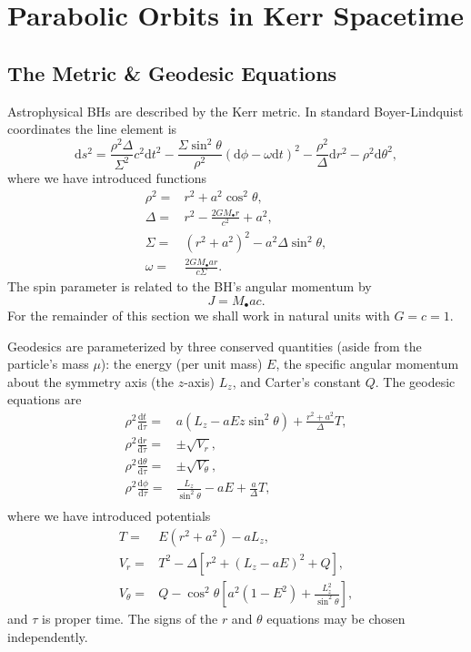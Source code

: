 \documentclass[a4paper, 11pt, titlepage, twoside]{report}
\newcommand{\dd}{\ensuremath{\mathrm{d}}}
\newcommand{\diff}[2]{\ensuremath{\frac{\dd {#1}}{\dd {#2}}}}
\begin{document}
\section{Parabolic Orbits in Kerr Spacetime}

\subsection{The Metric \& Geodesic Equations}

Astrophysical BHs are described by the Kerr metric\cite{Kerr1963}. In standard Boyer-Lindquist coordinates the line element is\cite{Boyer1967, Hobson2006}
\begin{equation}
\dd s^2 = \frac{\rho^2 \Delta}{\Sigma^2}c^2\dd t^2 - \frac{\Sigma \sin^2 \theta}{\rho^2}\left(\dd \phi - \omega \dd t\right)^2 - \frac{\rho^2}{\Delta}\dd r^2 - \rho^2\dd \theta^2,
\end{equation}
where we have introduced functions
\begin{align}
\rho^2 = {} & r^2 + a^2\cos^2\theta,\\
\Delta = {} & r^2 - \frac{2GM_\bullet r}{c^2} + a^2,\\
\Sigma = {} & \left(r^2 +a^2\right)^2 - a^2\Delta\sin^2\theta,\\
\omega = {} & \frac{2GM_\bullet ar}{c\Sigma}.
\end{align}
The spin parameter is related to the BH's angular momentum by
\begin{equation}
J = M_\bullet ac.
\end{equation}
For the remainder of this section we shall work in natural units with $G = c = 1$.

Geodesics are parameterized by three conserved quantities (aside from the particle's mass $\mu$): the energy (per unit mass) $E$, the specific angular momentum about the symmetry axis (the $z$-axis) $L_z$, and Carter's constant $Q$\cite{Carter1968, Chandrasekhar1998}. The geodesic equations are
\begin{align}
\rho^2 \diff{t}{\tau} = {} & a\left(L_z - aE z\sin^2 \theta\right) + \frac{r^2 + a^2}{\Delta}T,\\
\rho^2 \diff{r}{\tau} = {} & \pm \sqrt{V_r},\\
\rho^2 \diff{\theta}{\tau} = {} & \pm \sqrt{V_\theta},\\
\rho^2 \diff{\phi}{\tau} = {} & \frac{L_z}{\sin^2 \theta} - aE + \frac{a}{\Delta}T,\\
\end{align}
where we have introduced potentials
\begin{align}
T = {} & E\left(r^2 +a^2\right) - aL_z,\\
V_r = {} & T^2 - \Delta\left[r^2 + \left(L_z -aE\right)^2 + Q\right],\\
V_\theta = {} & Q - \cos^2 \theta\left[a^2\left(1 - E^2\right) + \frac{L_z^2}{\sin^2\theta}\right],
\end{align}
and $\tau$ is proper time. The signs of the $r$ and $\theta$ equations may be chosen independently.
\end{document}
